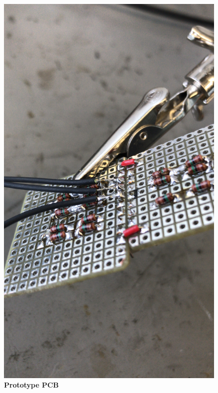 \begin{figure}[!t]
	\centering
	\includegraphics[width=1\columnwidth]{Appendix/haptic_feedback/handgemachtes_PCB_offen.JPG}
	\caption{\textbf{Prototype PCB}}
	\label{fig: PCB selfmade}
\end{figure}


